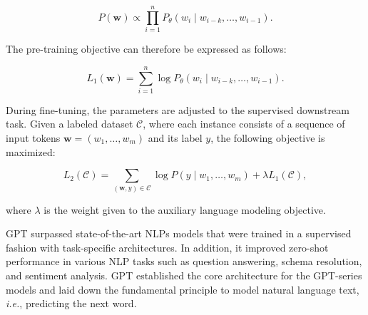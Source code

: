 \begin{equation}
    P(\bm{w}) \propto \prod_{i=1}^n P_{\theta}(w_i \mid w_{i-k}, \ldots, w_{i-1}).
\end{equation}

\noindent The pre-training objective can therefore be expressed as follows:

\begin{equation}
    L_1(\bm{w}) = \sum_{i=1}^n \log P_{\theta}(w_i \mid w_{i-k}, \ldots, w_{i-1}).
\end{equation}

\noindent During fine-tuning, the parameters are adjusted to the supervised downstream task. Given a labeled dataset $\mathcal{C}$, where each instance consists of a sequence of input tokens $\bm{w} = (w_1, \ldots, w_m)$ and its label $y$, the following objective is maximized:

\begin{equation}
    L_2(\mathcal{C}) = \sum_{(\bm{w}, y) \in \mathcal{C}} \log P(y \mid w_1, \ldots, w_m) + \lambda L_1(\mathcal{C}),
\end{equation}

\noindent where $\lambda$ is the weight given to the auxiliary language modeling objective.

\noindent \ac{GPT} surpassed state-of-the-art \acp{NLP} models that were trained in a supervised fashion with task-specific architectures. In addition, it improved zero-shot performance in various \ac{NLP} tasks such as question answering, schema resolution, and sentiment analysis. \ac{GPT} established the core architecture for the \ac{GPT}-series models and laid down the fundamental principle to model natural language text, \textit{i.e.}, predicting the next word.

